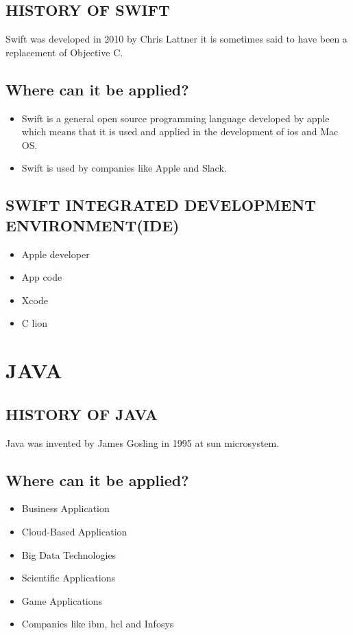 \documentclass{article}
\begin{document}
\subsection{HISTORY OF SWIFT}
Swift was developed in 2010 by Chris Lattner it is sometimes said to have been a replacement of Objective C.
\subsection{Where can it be applied?}
\begin{itemize}
	\item Swift is a general open source programming language developed by apple which means that it is used and applied in the development of ios and Mac OS.
	\item Swift is used by companies like Apple and Slack.
\end{itemize}
\subsection{SWIFT INTEGRATED DEVELOPMENT ENVIRONMENT(IDE)}
\begin{itemize}
	\item Apple developer
	\item App code
	\item Xcode
	\item C lion
	\end{itemize}
	\section{JAVA}
	\subsection{HISTORY OF JAVA}
	Java was invented by James Gosling in 1995 at sun microsystem.
	\subsection{Where can it be applied?}
	\begin{itemize}
		\item Business Application
		\item Cloud-Based Application
		\item Big Data Technologies
		\item Scientific Applications
		\item Game Applications
		\item Companies like ibm, hcl and Infosys
	\end{itemize}
\end{document}
